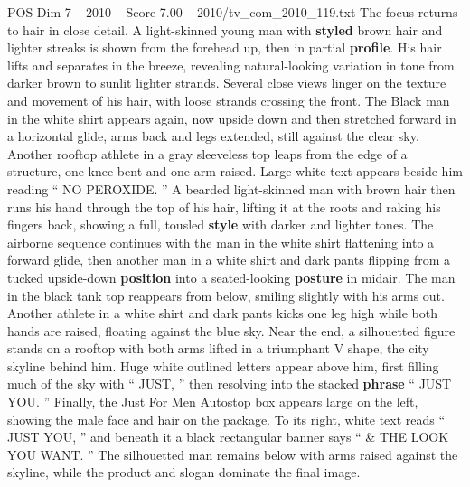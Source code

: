 \begin{textsample}{POS Dim 7 – 2010 – Score 7.00 – 2010/tv\_com\_2010\_119.txt}
The focus returns to hair in close detail.
A light-skinned young man with \textbf{styled} brown hair and lighter streaks is shown from the forehead up, then in partial \textbf{profile}.
His hair lifts and separates in the breeze, revealing natural-looking variation in tone from darker brown to sunlit lighter strands.
Several close views linger on the texture and movement of his hair, with loose strands crossing the front.
The Black man in the white shirt appears again, now upside down and then stretched forward in a horizontal glide, arms back and legs extended, still against the clear sky.
Another rooftop athlete in a gray sleeveless top leaps from the edge of a structure, one knee bent and one arm raised.
Large white text appears beside him reading “ NO PEROXIDE. ” A bearded light-skinned man with brown hair then runs his hand through the top of his hair, lifting it at the roots and raking his fingers back, showing a full, tousled \textbf{style} with darker and lighter tones.
The airborne sequence continues with the man in the white shirt flattening into a forward glide, then another man in a white shirt and dark pants flipping from a tucked upside-down \textbf{position} into a seated-looking \textbf{posture} in midair.
The man in the black tank top reappears from below, smiling slightly with his arms out.
Another athlete in a white shirt and dark pants kicks one leg high while both hands are raised, floating against the blue sky.
Near the end, a silhouetted figure stands on a rooftop with both arms lifted in a triumphant V shape, the city skyline behind him.
Huge white outlined letters appear above him, first filling much of the sky with “ JUST, ” then resolving into the stacked \textbf{phrase} “ JUST YOU. ” Finally, the Just For Men Autostop box appears large on the left, showing the male face and hair on the package.
To its right, white text reads “ JUST YOU, ” and beneath it a black rectangular banner says “ \& THE LOOK YOU WANT. ” The silhouetted man remains below with arms raised against the skyline, while the product and slogan dominate the final image.

\end{textsample}
